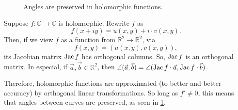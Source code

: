 
\begin{figure}[htb]
    \centering
    \caption{Angles are preserved in holomorphic functions.}
    \label{fig:angles-holomorphic}
\end{figure}

\begin{prop}
	Suppose $f: \mathbb{C} \to \mathbb{C}$ is holomorphic. Rewrite $f$ as \[
		f(x+ iy) = u(x, y) + i\cdot v(x, y).
	\]
	Then, if we view $f$ as a function from $\mathbb{R}^2 \to \mathbb{R}^2$, via \[
		f(x, y) = (u(x, y), v(x, y)),
	\] its Jacobian matrix $\operatorname{Jac} f$ has orthogonal columns. So, $\operatorname{Jac} f$ is an orthogonal matrix. In especial, if $\vec a, \vec b \in \mathbb{R}^2$, then $\angle(\vec a, \vec b) = \angle(\operatorname{Jac} f \cdot \vec a, \operatorname{Jac} f \cdot \vec b)$.
\end{prop}

Therefore, holomorphic functions are approximated (to better and better accuracy) by orthogonal linear transformations. So long as $f' \neq 0$, this means that angles between curves are preserved, as seen in \cref{fig:angles-holomorphic}.
